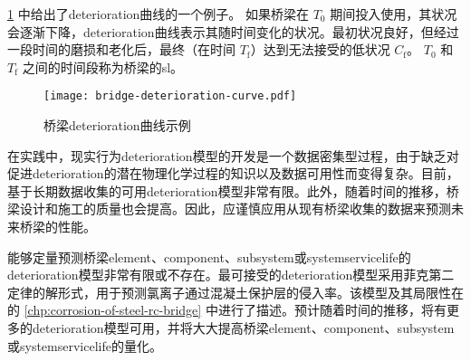 \cref{fig:bridge-deterioration-curve} 中给出了\gls*{deterioration}曲线的一个例子。 如果桥梁在 $T_0$ 期间投入使用，其状况会逐渐下降，\gls*{deterioration}曲线表示其随时间变化的状况。最初状况良好，但经过一段时间的磨损和老化后，最终（在时间 $T_\text{f}$）达到无法接受的低状况 $C_\text{f}$。 $T_0$ 和 $T_\text{f}$ 之间的时间段称为桥梁的\acrfull{sl}。

\begin{figure}
  \texttt{[image: bridge-deterioration-curve.pdf]}
  \caption{桥梁\gls*{deterioration}曲线示例}\label{fig:bridge-deterioration-curve}
\end{figure}

在实践中，现实行为\gls*{deterioration}模型的开发是一个数据密集型过程，由于缺乏对促进\gls*{deterioration}的潜在物理化学过程的知识以及数据可用性而变得复杂。目前，基于长期数据收集的可用\gls*{deterioration}模型非常有限。此外，随着时间的推移，桥梁设计和施工的质量也会提高。因此，应谨慎应用从现有桥梁收集的数据来预测未来桥梁的性能。

能够定量预测桥梁\gls*{element}、\gls*{component}、\gls*{subsystem}或\gls*{system}\gls*{servicelife}的\gls*{deterioration}模型非常有限或不存在。最可接受的\gls*{deterioration}模型采用菲克第二定律的解形式，用于预测氯离子通过混凝土保护层的侵入率。该模型及其局限性在的 \cref{chp:corrosion-of-steel-rc-bridge} 中进行了描述。预计随着时间的推移，将有更多的\gls*{deterioration}模型可用，并将大大提高桥梁\gls*{element}、\gls*{component}、\gls*{subsystem}或\gls*{system}\gls*{servicelife}的量化。

